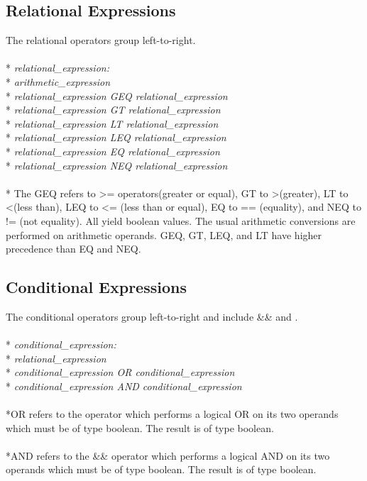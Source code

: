 \subsection{Relational Expressions}
The relational operators group left-to-right.
\\ \\* \tab \emph{relational\_expression:}
\\* \tab \tab \emph{arithmetic\_expression}
\\* \tab \tab \emph{relational\_expression GEQ relational\_expression}
\\* \tab \tab \emph{relational\_expression GT relational\_expression}
\\* \tab \tab \emph{relational\_expression LT relational\_expression}
\\* \tab \tab \emph{relational\_expression LEQ relational\_expression}
\\* \tab \tab \emph{relational\_expression EQ relational\_expression}
\\* \tab \tab \emph{relational\_expression NEQ relational\_expression}
\\ \\* The GEQ refers to \textgreater= operators(greater or equal), GT to
\textgreater (greater), LT to \textless (less than), LEQ to \textless= (less
than or equal), EQ to == (equality), and NEQ to != (not equality). All yield
boolean values. The usual arithmetic conversions are performed on
arithmetic operands. GEQ, GT, LEQ, and LT have higher precedence than EQ and
NEQ.

\subsection{Conditional Expressions}
The conditional operators group left-to-right and include \&\& and \textbar\textbar.
\\ \\* \tab \emph{conditional\_expression:}
\\* \tab \tab \emph{relational\_expression}
\\* \tab \tab \emph{conditional\_expression OR conditional\_expression}
\\* \tab \tab \emph{conditional\_expression AND conditional\_expression}
\\ \\*OR refers to the \textbar\textbar operator which performs a logical OR on its two operands which must be of type boolean. The result is of type boolean. 
\\ \\*AND refers to the \&\& operator which performs a logical AND on its two operands which must be of type boolean. The result is of type boolean.

